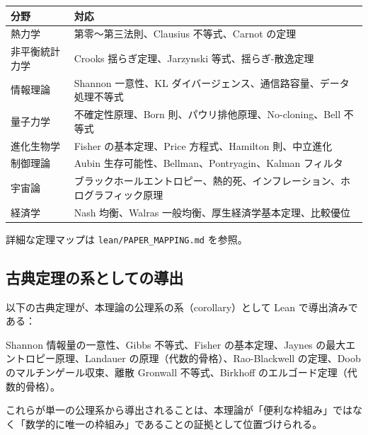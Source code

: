 \documentclass[12pt,a4paper]{article}
\begin{document}
{\def\LTcaptype{table} %
\begin{longtable}[]{@{}
  >{\raggedright\arraybackslash}p{}
  >{\raggedright\arraybackslash}p{}@{}}
\toprule\noalign{}
\begin{minipage}[b]{\linewidth}\raggedright
分野
\end{minipage} & \begin{minipage}[b]{\linewidth}\raggedright
対応
\end{minipage} \\
\midrule\noalign{}
\endhead
\bottomrule\noalign{}
\endlastfoot
熱力学 & 第零〜第三法則、Clausius 不等式、Carnot の定理 \\
非平衡統計力学 & Crooks 揺らぎ定理、Jarzynski 等式、揺らぎ-散逸定理 \\
情報理論 & Shannon 一意性、KL ダイバージェンス、通信路容量、データ処理不等式 \\
量子力学 & 不確定性原理、Born 則、パウリ排他原理、No-cloning、Bell 不等式 \\
進化生物学 & Fisher の基本定理、Price 方程式、Hamilton 則、中立進化 \\
制御理論 & Aubin 生存可能性、Bellman、Pontryagin、Kalman フィルタ \\
宇宙論 & ブラックホールエントロピー、熱的死、インフレーション、ホログラフィック原理 \\
経済学 & Nash 均衡、Walras 一般均衡、厚生経済学基本定理、比較優位 \\
\end{longtable}
}

詳細な定理マップは \texttt{lean/PAPER\_MAPPING.md} を参照。

\subsection{古典定理の系としての導出}\label{ux53e4ux5178ux5b9aux7406ux306eux7cfbux3068ux3057ux3066ux306eux5c0eux51fa}

以下の古典定理が、本理論の公理系の系（corollary）として Lean で導出済みである：

Shannon 情報量の一意性、Gibbs 不等式、Fisher の基本定理、Jaynes の最大エントロピー原理、Landauer の原理（代数的骨格）、Rao-Blackwell の定理、Doob のマルチンゲール収束、離散 Gronwall 不等式、Birkhoff のエルゴード定理（代数的骨格）。

これらが単一の公理系から導出されることは、本理論が「便利な枠組み」ではなく「数学的に唯一の枠組み」であることの証拠として位置づけられる。
\end{document}
